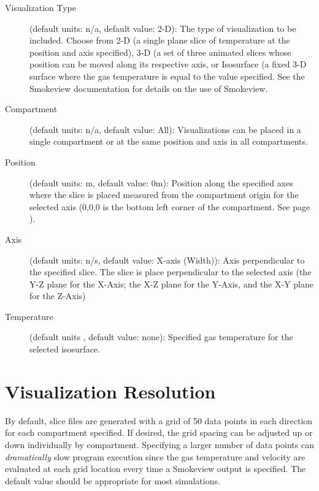 \begin{description}
\item[Visualization Type] (default units: n/a, default value: 2-D): The type of visualization to be included. Choose from 2-D (a single plane slice of temperature at the position and axis specified), 3-D (a set of three animated slices whose position can be moved along its respective axis, or Isosurface (a fixed 3-D surface where the gas temperature is equal to the value specified. See the Smokeview documentation \cite{Smokeview_Users_Guide_6} for details on the use of Smokeview.

\item[Compartment] (default units: n/a, default value: All): Visualizations can be placed in a single compartment or at the same position and axis in all compartments.

\item[Position] (default units: m, default value: 0m): Position along the specified axes where the slice is placed measured from the compartment origin for the selected axis (0,0,0 is the bottom left corner of the compartment. See page \pageref{Compartment_Geometry}).

\item[Axis] (default units: n/s, default value: X-axis (Width)): Axis perpendicular to the specified slice.  The slice is place perpendicular to the selected axis (the Y-Z plane for the X-Axis; the X-Z plane for the Y-Axis, and the X-Y plane for the Z-Axis)

\item[Temperature] (default units \degc, default value: none): Specified gas temperature for the selected isosurface.
\end{description}


\section{Visualization Resolution}

By default, slice files are generated with a grid of 50 data points in each direction for each compartment specified. If desired, the grid spacing can be adjusted up or down individually by compartment. Specifying a larger number of data points can \textit{dramatically} slow program execution since the gas temperature and velocity are evaluated at each grid location every time a Smokeview output is specified.  The default value should be appropriate for most simulations.

